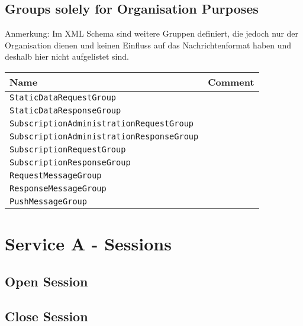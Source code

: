 \subsection*{Groups solely for Organisation Purposes}
Anmerkung: Im XML Schema sind weitere Gruppen definiert, die jedoch nur der Organisation dienen und keinen Einfluss auf das Nachrichtenformat haben und deshalb hier nicht aufgelistet sind.
\begin{samepage}
\begin{flushleft}
\begin{tabularx}{\linewidth}{l>{\raggedright\arraybackslash}X}
\toprule
Name &  Comment \label{tab:miscGroups}\\
\midrule
\texttt{StaticDataRequestGroup} & \\
\texttt{StaticDataResponseGroup}& \\
\texttt{SubscriptionAdministrationRequestGroup} & \\
\texttt{SubscriptionAdministrationResponseGroup}& \\
\texttt{SubscriptionRequestGroup} & \\
\texttt{SubscriptionResponseGroup}& \\
\texttt{RequestMessageGroup}& \\
\texttt{ResponseMessageGroup}& \\
\texttt{PushMessageGroup}& \\
\bottomrule
\end{tabularx}\end{flushleft}\end{samepage}

\section{Service A - Sessions}
\label{sec:Nachrichten:DienstA}

\subsection*{Open Session}
\label{subsec:Nachrichten:DienstA:OpenSession}





\subsection*{Close Session}
\label{subsec:Nachrichten:DienstA:CloseSession}





